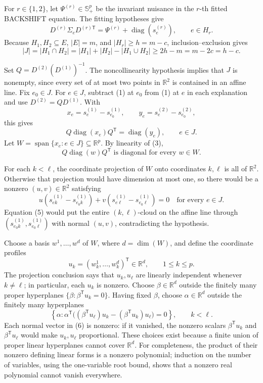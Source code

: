 For \(r\in\{1,2\}\), let \(\Psi^{(r)}\in\mathbb S_+^p\) be the invariant nuisance in the \(r\)-th fitted BACKSHIFT equation.  The fitting hypotheses give
\[
 D^{(r)}\Sigma_eD^{(r)\mathsf T}
 =\Psi^{(r)}+\operatorname{diag}(s^{(r)}_e),
 \qquad e\in H_r.
 \tag{1}
\]
Because \(H_1,H_2\subseteq E\), \(|E|=m\), and \(|H_r|\ge h=m-c\), inclusion--exclusion gives
\[
 |J|=|H_1\cap H_2|
 =|H_1|+|H_2|-|H_1\cup H_2|
 \ge 2h-m=m-2c=h-c.
 \tag{2}
\]

Set \(Q=D^{(2)}(D^{(1)})^{-1}\).  The noncollinearity hypothesis implies that \(J\) is nonempty, since every set of at most two points in \(\mathbb R^2\) is contained in an affine line.  Fix \(e_0\in J\).  For \(e\in J\), subtract (1) at \(e_0\) from (1) at \(e\) in each explanation and use \(D^{(2)}=QD^{(1)}\).  With
\[
 x_e=s^{(1)}_e-s^{(1)}_{e_0},
 \qquad
 y_e=s^{(2)}_e-s^{(2)}_{e_0},
\]
this gives
\[
 Q\operatorname{diag}(x_e)Q^{\mathsf T}
 =\operatorname{diag}(y_e),
 \qquad e\in J.
 \tag{3}
\]
Let \(W=\operatorname{span}\{x_e:e\in J\}\subseteq\mathbb R^p\).  By linearity of (3),
\[
 Q\operatorname{diag}(w)Q^{\mathsf T}
 \text{ is diagonal for every }w\in W.
 \tag{4}
\]

For each \(k<\ell\), the coordinate projection of \(W\) onto coordinates \(k,\ell\) is all of \(\mathbb R^2\).  Otherwise that projection would have dimension at most one, so there would be a nonzero \((u,v)\in\mathbb R^2\) satisfying
\[
 u(s^{(1)}_{ek}-s^{(1)}_{e_0k})
 +v(s^{(1)}_{e\ell}-s^{(1)}_{e_0\ell})=0
 \quad\text{for every }e\in J.
 \tag{5}
\]
Equation (5) would put the entire \((k,\ell)\)-cloud on the affine line through \((s^{(1)}_{e_0k},s^{(1)}_{e_0\ell})\) with normal \((u,v)\), contradicting the hypothesis.

Choose a basis \(w^1,\ldots,w^d\) of \(W\), where \(d=\dim(W)\), and define the coordinate profiles
\[
 u_k=(w^1_k,\ldots,w^d_k)^{\mathsf T}\in\mathbb R^d,
 \qquad 1\le k\le p.
\]
The projection conclusion says that \(u_k,u_\ell\) are linearly independent whenever \(k\ne\ell\); in particular, each \(u_k\) is nonzero.  Choose \(\beta\in\mathbb R^d\) outside the finitely many proper hyperplanes \(\{\beta:\beta^{\mathsf T}u_k=0\}\).  Having fixed \(\beta\), choose \(\alpha\in\mathbb R^d\) outside the finitely many hyperplanes
\[
 \left\{\alpha:
 \alpha^{\mathsf T}\bigl((\beta^{\mathsf T}u_\ell)u_k
 -(\beta^{\mathsf T}u_k)u_\ell\bigr)=0\right\},
 \qquad k<\ell.
 \tag{6}
\]
Each normal vector in (6) is nonzero: if it vanished, the nonzero scalars \(\beta^{\mathsf T}u_k\) and \(\beta^{\mathsf T}u_\ell\) would make \(u_k,u_\ell\) proportional.  These choices exist because a finite union of proper linear hyperplanes cannot cover \(\mathbb R^d\).  For completeness, the product of their nonzero defining linear forms is a nonzero polynomial; induction on the number of variables, using the one-variable root bound, shows that a nonzero real polynomial cannot vanish everywhere.

